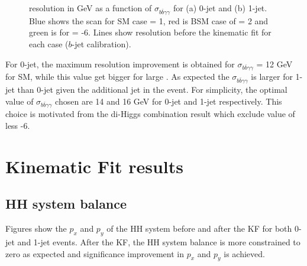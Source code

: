 \begin{figure}[htbp]
   \centering
   \caption{\mbb resolution in GeV as a function of $\sigma_{b\bar{b}\gamma\gamma}$ for (a) 0-jet and (b) 1-jet. Blue shows the scan for SM case \kl = 1, red is BSM case of \kl = 2 and green is for \kl = -6. Lines show \mbb resolution before the kinematic fit for each case ($b$-jet calibration).}
   \label{fig:Adx4:Scan}
\end{figure}

For 0-jet, the maximum \mbb resolution improvement is obtained for $\sigma_{b\bar{b}\gamma\gamma}$ = 12 GeV for SM, while this value get bigger for large \kl. As expected the $\sigma_{b\bar{b}\gamma\gamma}$ is larger for 1-jet than 0-jet given the additional jet in the event. For simplicity, the optimal value of $\sigma_{b\bar{b}\gamma\gamma}$ chosen are 14 and 16 GeV for 0-jet and 1-jet respectively. This choice is motivated from the di-Higgs combination result which exclude value of \kl less -6.  

\section{Kinematic Fit results}

\subsection{HH system balance}
Figures show the $p_x$ and $p_y$ of the HH system before and after the KF for both 0-jet and 1-jet events. After the KF, the HH system balance is more constrained to zero as expected and significance improvement in $p_x$ and $p_y$ is achieved. 

